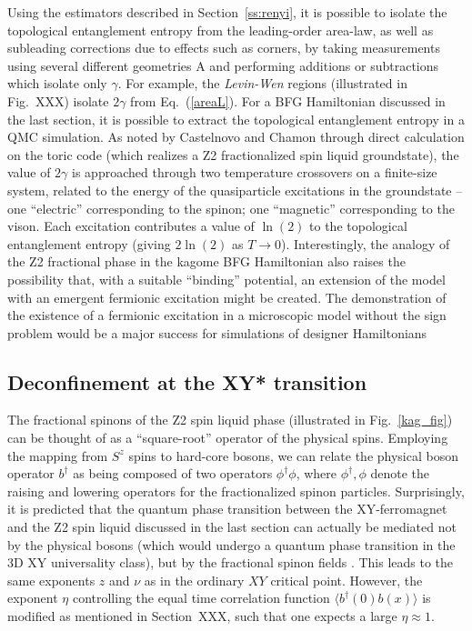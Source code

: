 \documentclass[range]{ar2e}
\begin{document}
Using the estimators described in Section~\ref{ss:renyi}, it is possible to isolate the topological entanglement entropy from the leading-order area-law, as well as subleading corrections due to effects such as corners, by taking measurements using several different geometries A and performing additions or subtractions which isolate only $\gamma$.  For example, the {\it Levin-Wen} \cite{LW} regions (illustrated in Fig.~XXX) isolate $2\gamma$ from Eq.~(\ref{areaL}).  For a BFG Hamiltonian discussed in the last section, it is possible to extract the topological entanglement entropy in a QMC simulation.  As noted by Castelnovo and Chamon \cite{castelnovo} through direct calculation on the toric code (which realizes a Z2 fractionalized spin liquid groundstate), the value of $2\gamma$ is approached through two temperature crossovers on a finite-size system, related to the energy of the quasiparticle excitations in the groundstate -- one ``electric'' corresponding to the spinon; one ``magnetic'' corresponding to the vison.  Each excitation contributes a value of $\ln(2)$ to the topological entanglement entropy (giving $2\ln(2)$ as $T \rightarrow 0$).  Interestingly, the analogy of the Z2 fractional phase in the kagome BFG Hamiltonian also raises the possibility that, with a suitable ``binding'' potential, an extension of the model with an emergent fermionic excitation might be created.  The demonstration of the existence of a fermionic excitation in a microscopic model without the sign problem would be a major success for simulations of designer Hamiltonians

\subsection{Deconfinement at the XY* transition} \label{XYstar}

The fractional spinons of the Z2 spin liquid phase (illustrated in Fig.~\ref{kag_fig}) can be thought of as a ``square-root'' operator of the physical spins.  Employing the mapping from $S^z$ spins to hard-core bosons, we can relate the physical boson operator $b^{\dagger}$ as being composed of two operators  $\phi^\dagger \phi$, where $\phi^\dagger,\phi$ denote the raising and lowering operators for the fractionalized spinon particles.  
Surprisingly, it is predicted that the quantum phase transition between the XY-ferromagnet and the Z2 spin liquid discussed in the last section can actually be mediated not by the physical bosons (which would undergo a quantum phase transition in the 3D XY universality class), but by the fractional spinon fields \cite{XYstar1,XYstar2,earlyXYstar}.  This leads to the same exponents $z$ and $\nu$ as in the ordinary $XY$ critical point.  However, the exponent $\eta$ controlling the equal time correlation function $\langle b^\dagger(0) b(x) \rangle$ is modified as mentioned in Section~XXX, such that one expects a large $\eta \approx 1$.
\end{document}
